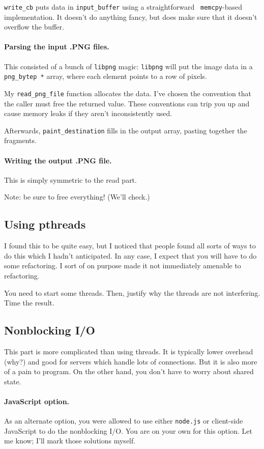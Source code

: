 \documentclass[11pt]{article}
\begin{document}
{\tt write\_cb} puts data in {\tt input\_buffer} using a straightforward {\tt
  memcpy}-based implementation. It doesn't do anything fancy, but does
make sure that it doesn't overflow the buffer.

\paragraph{Parsing the input .PNG files.} This consisted of a
bunch of {\tt libpng} magic: {\tt libpng} will put the image data
in a {\tt png\_bytep *} array, where each element points to a row of
pixels.

My {\tt read\_png\_file} function allocates the data. I've
chosen the convention that the caller must free the returned value.
These conventions can trip you up and cause memory leaks if they
aren't inconsistently used. 

Afterwards, {\tt paint\_destination} fills in the output array, pasting together
the fragments.

\paragraph{Writing the output .PNG file.} This is simply symmetric
to the read part.

Note: be sure to free everything! (We'll check.)

\subsection*{Using pthreads}
I found this to be quite easy, but I noticed that people found all sorts
of ways to do this which I hadn't anticipated. In any case, I expect that
you will have to do some refactoring. I sort of on purpose made it not
immediately amenable to refactoring.

You need to start some threads. Then, justify why the threads are not
interfering. Time the result.

\subsection*{Nonblocking I/O}
This part is more complicated than using threads. It is typically lower
overhead (why?) and good for servers which handle lots of connections.
But it is also more of a pain to program. On the other hand, you don't have
to worry about shared state.

\paragraph{JavaScript option.} 
As an alternate option, you were allowed to use either {\tt node.js}
or client-side JavaScript to do the nonblocking I/O. You are on your
own for this option. Let me know; I'll mark those solutions myself.
\end{document}
